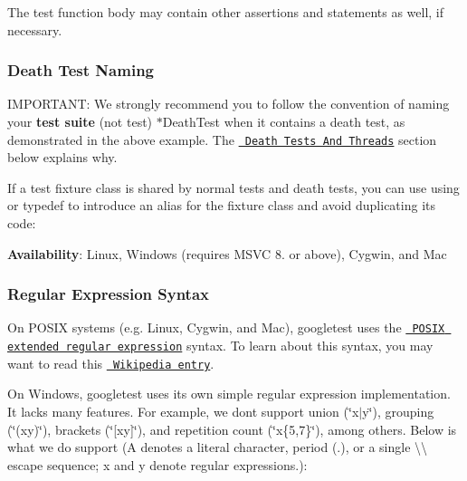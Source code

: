 The test function body may contain other assertions and statements as well, if necessary.

\subsubsection*{Death Test Naming}

I\+M\+P\+O\+R\+T\+A\+NT\+: We strongly recommend you to follow the convention of naming your {\bfseries{test suite}} (not test) {\ttfamily $\ast$\+Death\+Test} when it contains a death test, as demonstrated in the above example. The \href{\#death-tests-and-threads}{\texttt{ Death Tests And Threads}} section below explains why.

If a test fixture class is shared by normal tests and death tests, you can use {\ttfamily using} or {\ttfamily typedef} to introduce an alias for the fixture class and avoid duplicating its code\+:


\begin{DoxyCode}{0}
\DoxyCodeLine{}
\DoxyCodeLine{}
\DoxyCodeLine{\}}
\DoxyCodeLine{}
\DoxyCodeLine{\}}
\end{DoxyCode}


{\bfseries{Availability}}\+: Linux, Windows (requires M\+S\+VC 8. or above), Cygwin, and Mac

\subsubsection*{Regular Expression Syntax}

On P\+O\+S\+IX systems (e.\+g. Linux, Cygwin, and Mac), googletest uses the \href{http://www.opengroup.org/onlinepubs/009695399/basedefs/xbd_chap09.html\#tag_09_04}{\texttt{ P\+O\+S\+IX extended regular expression}} syntax. To learn about this syntax, you may want to read this \href{http://en.wikipedia.org/wiki/Regular_expression\#POSIX_Extended_Regular_Expressions}{\texttt{ Wikipedia entry}}.

On Windows, googletest uses its own simple regular expression implementation. It lacks many features. For example, we don\textquotesingle{}t support union ({\ttfamily \char`\"{}x$\vert$y\char`\"{}}), grouping ({\ttfamily \char`\"{}(xy)\char`\"{}}), brackets ({\ttfamily \char`\"{}\mbox{[}xy\mbox{]}\char`\"{}}), and repetition count ({\ttfamily \char`\"{}x\{5,7\}\char`\"{}}), among others. Below is what we do support ({\ttfamily A} denotes a literal character, period ({\ttfamily .}), or a single {\ttfamily \textbackslash{}\textbackslash{}} escape sequence; {\ttfamily x} and {\ttfamily y} denote regular expressions.)\+:

